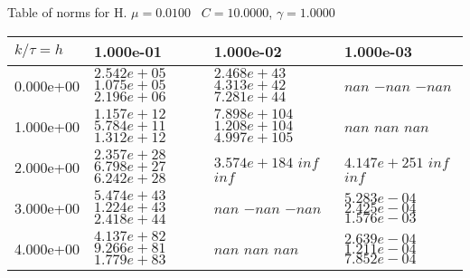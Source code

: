 \begin{center}
Table of norms for H. $\mu = 0.0100$ \, $C = 10.0000$, $\gamma = 1.0000$
  
\begin{tabular}{|p{1in}|p{1in}|p{1in}|p{1in}|} \hline
$k / \tau = h$ &1.000e-01 &1.000e-02 &1.000e-03 \\ \hline 
0.000e+00 & $2.542e+05$  $1.075e+05$  $2.196e+06$  & $2.468e+43$  $4.313e+42$  $7.281e+44$  & $nan$  $-nan$  $-nan$  \\ \hline 
1.000e+00 & $1.157e+12$  $5.784e+11$  $1.312e+12$  & $7.898e+104$  $1.208e+104$  $4.997e+105$  & $nan$  $nan$  $nan$  \\ \hline 
2.000e+00 & $2.357e+28$  $6.798e+27$  $6.242e+28$  & $3.574e+184$  $inf$  $inf$  & $4.147e+251$  $inf$  $inf$  \\ \hline 
3.000e+00 & $5.474e+43$  $1.224e+43$  $2.418e+44$  & $nan$  $-nan$  $-nan$  & $5.283e-04$  $2.425e-04$  $1.576e-03$  \\ \hline 
4.000e+00 & $4.137e+82$  $9.266e+81$  $1.779e+83$  & $nan$  $nan$  $nan$  & $2.639e-04$  $1.211e-04$  $7.852e-04$  \\ \hline 

\end{tabular}\\[20pt]
\end{center}
